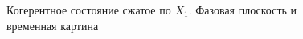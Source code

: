 \begin{figure}
\centering



\caption{Когерентное состояние сжатое по $X_1$. Фазовая плоскость и
  временная картина}
\label{figPart3Squeezed_4}
\end{figure}
